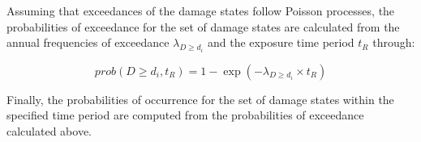 Assuming that exceedances of the damage states follow Poisson processes, the probabilities of exceedance for the set of damage states are calculated from the annual frequencies of exceedance $\lambda_{D \geq d_i}$ and the exposure time period $t_R$ through:

\begin{equation}
	prob(D \geq d_i, t_R) = 1 - \exp (-\lambda_{D \geq d_i} \times t_R)
\end{equation}

Finally, the probabilities of occurrence for the set of damage states within the specified time period are computed from the probabilities of exceedance calculated above.